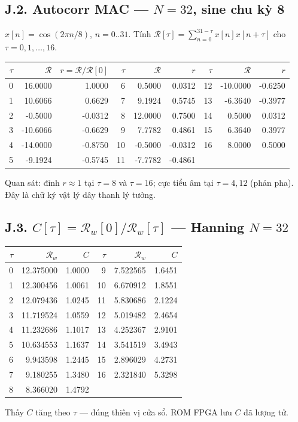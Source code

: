 \subsection*{J.2. Autocorr MAC --- $N=32$, sine chu kỳ 8}
$x[n]=\cos(2\pi n/8)$, $n=0..31$. Tính $\mathcal{R}[\tau]=\sum_{n=0}^{31-\tau}x[n]x[n+\tau]$ cho $\tau=0,1,\ldots,16$.
\begin{center}\scriptsize
\begin{tabular}{@{}rrrrrrrrr@{}}
\toprule
$\tau$ & $\mathcal{R}$ & $r=\mathcal{R}/\mathcal{R}[0]$ & $\tau$ & $\mathcal{R}$ & $r$ & $\tau$ & $\mathcal{R}$ & $r$ \\
\midrule
0 & 16.0000 & 1.0000 & 6 & 0.5000 & 0.0312 & 12 & -10.0000 & -0.6250 \\
1 & 10.6066 & 0.6629 & 7 & 9.1924 & 0.5745 & 13 & -6.3640 & -0.3977 \\
2 & -0.5000 & -0.0312 & 8 & 12.0000 & 0.7500 & 14 & 0.5000 & 0.0312 \\
3 & -10.6066 & -0.6629 & 9 & 7.7782 & 0.4861 & 15 & 6.3640 & 0.3977 \\
4 & -14.0000 & -0.8750 & 10 & -0.5000 & -0.0312 & 16 & 8.0000 & 0.5000 \\
5 & -9.1924 & -0.5745 & 11 & -7.7782 & -0.4861 &  & &  \\
\bottomrule
\end{tabular}
\end{center}
Quan sát: đỉnh $r\approx1$ tại $\tau=8$ và $\tau=16$; cực tiểu âm tại $\tau=4,12$ (phản pha). Đây là chữ ký vật lý dây thanh lý tưởng.

\subsection*{J.3. $C[\tau]=\mathcal{R}_w[0]/\mathcal{R}_w[\tau]$ --- Hanning $N=32$}
\begin{center}\scriptsize
\begin{tabular}{@{}rrrrrr@{}}
\toprule
$\tau$ & $\mathcal{R}_w$ & $C$ & $\tau$ & $\mathcal{R}_w$ & $C$ \\
\midrule
0 & 12.375000 & 1.0000 & 9 & 7.522565 & 1.6451 \\
1 & 12.300456 & 1.0061 & 10 & 6.670912 & 1.8551 \\
2 & 12.079436 & 1.0245 & 11 & 5.830686 & 2.1224 \\
3 & 11.719524 & 1.0559 & 12 & 5.019482 & 2.4654 \\
4 & 11.232686 & 1.1017 & 13 & 4.252367 & 2.9101 \\
5 & 10.634553 & 1.1637 & 14 & 3.541519 & 3.4943 \\
6 & 9.943598 & 1.2445 & 15 & 2.896029 & 4.2731 \\
7 & 9.180255 & 1.3480 & 16 & 2.321840 & 5.3298 \\
8 & 8.366020 & 1.4792 &  & &  \\
\bottomrule
\end{tabular}
\end{center}
Thấy $C$ tăng theo $\tau$ --- đúng thiên vị cửa sổ. ROM FPGA lưu $C$ đã lượng tử.

